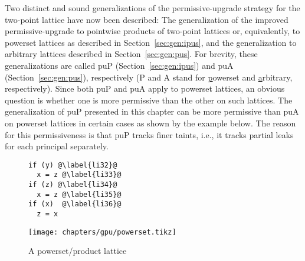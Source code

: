 Two distinct and sound generalizations of the permissive-upgrade
strategy for the two-point lattice have now been described:
The generalization of the improved permissive-upgrade to pointwise
products of two-point lattices or, equivalently, to powerset lattices
as described in Section~\ref{sec:gen:ipus}, and the generalization to
arbitrary lattices described in Section~\ref{sec:gen:pus}. For brevity,
these generalizations are called puP (Section~\ref{sec:gen:ipus}) and
puA (Section~\ref{sec:gen:pus}), 
respectively (P and A stand for \underline{p}owerset and
\underline{a}rbitrary, respectively). Since both puP and puA apply to
powerset lattices, an obvious question is whether one is more
permissive than the other on such lattices. The generalization of puP
presented in this chapter can be more permissive than puA on powerset 
lattices in certain cases as shown by the example
below. The reason for this permissiveness is that puP tracks finer
taints, i.e., it tracks partial leaks for each principal separately. 

\begin{figure}[ht]
\begin{minipage}{0.65\linewidth}
\centering
\begin{lstlisting}[caption=Example where puP is more permissive than puA,label=list3]
if (y) @\label{li32}@
  x = z @\label{li33}@
if (z) @\label{li34}@
  x = z @\label{li35}@
if (x)  @\label{li36}@
  z = x
\end{lstlisting}
\end{minipage}
\hspace{-1.5cm}
\begin{minipage}{0.45\linewidth}
\centering
{\texttt{[image: chapters/gpu/powerset.tikz]}}
\caption{A powerset/product lattice}\label{fig:lattice1}
\end{minipage}
\end{figure}

